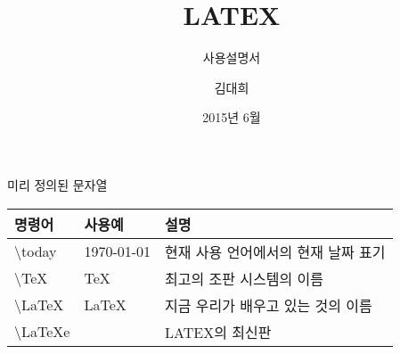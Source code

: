 \documentclass[ aspectratio=149,  10pt,blue,xcolor=pdftex,dvipsnames,table,handout,notes]{beamer}
\begin{document}
	

			\title{LATEX}
			\subtitle{사용설명서}
			\author{김대희}
			\date[2015.06.30]{2015년 6월}



		\begin{frame}[plain]
		\titlepage
		\end{frame}

		\begin{frame}[plain]
		\end{frame}






		\begin{frame}[t,allowframebreaks]{미리 정의된 문자열}

			\begin{center}
			\begin{table}
			\begin{tabular}{ l l l  }
				명령어	&사용예	&설명\\
				\hline
				\textbackslash today 	&\today 		&현재 사용 언어에서의 현재 날짜 표기\\
				\textbackslash TeX 	&\TeX 		&최고의 조판 시스템의 이름\\
				\textbackslash LaTeX 	&\LaTeX 		&지금 우리가 배우고 있는 것의 이름\\
				\textbackslash LaTeXe 	&\LaTeXe		&LATEX의 최신판\\
			\end{tabular}
			\end{table}
			\end{center}

		\note[item]{}
		\end{frame}
\end{document}
